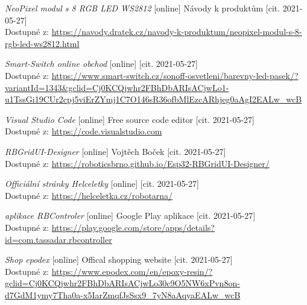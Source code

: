 \begin{thebibliography}{99}
\textit{NeoPixel modul s 8 RGB LED WS2812} [online] Návody k produktům [cit. 2021-05-27] \\
Dostupné z: \url{https://navody.dratek.cz/navody-k-produktum/neopixel-modul-s-8-rgb-led-ws2812.html}



\textit{Smart-Switch online obchod} [online]  [cit. 2021-05-27] \\
Dostupné z: \url{https://www.smart-switch.cz/sonoff-osvetleni/barevny-led-pasek/?variantId=1343&gclid=Cj0KCQjwhr2FBhDbARIsACjwLo1-u1TssGi19CUr2cpj5viErZYmj1C7O146sR36ofbMlEzcARhjeg0aAgI2EALw_wcB}

\textit{Visual Studio Code} [online] Free source code editor [cit. 2021-05-27] \\
Dostupné z: \url{https://code.visualstudio.com} 


\textit{RBGridUI-Designer} [online] Vojtěch Boček [cit. 2021-05-27] \\
Dostupné z: \url{https://roboticsbrno.github.io/Esp32-RBGridUI-Designer/} 

\textit {Officiální stránky Helceletky} [online] [cit. 2021-05-27] \\
Dostupné z: \url{https://helceletka.cz/robotarna/}


\textit{aplikace RBControler} [online] Google Play aplikace [cit. 2021-05-27] \\
Dostupné z: \url{https://play.google.com/store/apps/details?id=com.tassadar.rbcontroller}

\textit{Shop epodex} [online] Offical shopping website [cit. 2021-05-27] \\
Dostupné z: \url{https://www.epodex.com/en/epoxy-resin/?gclid=Cj0KCQjwhr2FBhDbARIsACjwLo30c9O5NW6xPvn8on-d7GdM1ymy7Tha0a-x5IarZmqfJsSsx9_7yN8aAqyaEALw_wcB}

\end{thebibliography}
